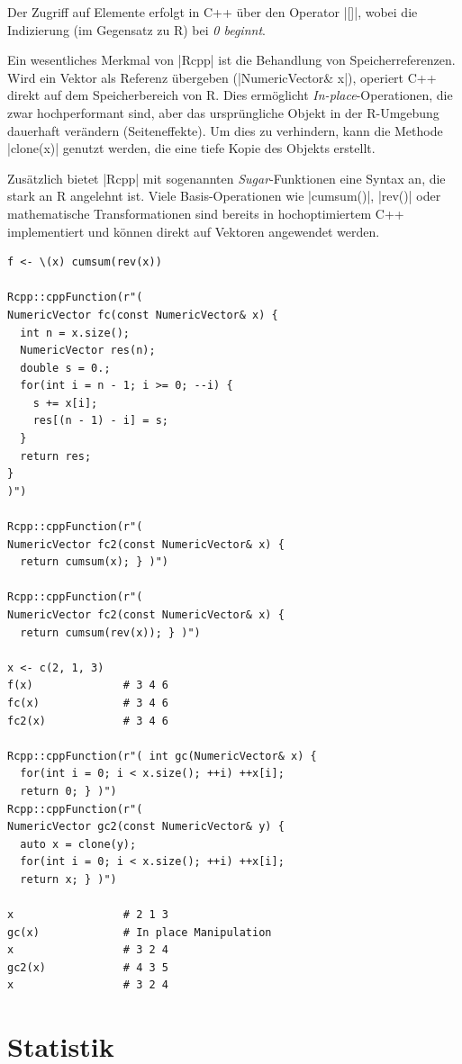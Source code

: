 \documentclass[10pt,twocolumn]{scrartcl}
\renewcommand{\lstinline}{\mycoloredinline}
\begin{document}
Der Zugriff auf Elemente erfolgt in C++ über den Operator \lstinline|[]|, wobei die Indizierung (im Gegensatz zu R) bei \emph{0 beginnt}.

Ein wesentliches Merkmal von \lstinline|Rcpp| ist die Behandlung von Speicherreferenzen. Wird ein Vektor als Referenz übergeben (\lstinline|NumericVector& x|), operiert C++ direkt auf dem Speicherbereich von R. Dies ermöglicht \textit{In-place}-Operationen, die zwar hochperformant sind, aber das ursprüngliche Objekt in der R-Umgebung dauerhaft verändern (Seiteneffekte). Um dies zu verhindern, kann die Methode \lstinline|clone(x)| genutzt werden, die eine tiefe Kopie des Objekts erstellt.

Zusätzlich bietet \lstinline|Rcpp| mit sogenannten \textit{Sugar}-Funktionen eine Syntax an, die stark an R angelehnt ist. Viele Basis-Operationen wie \lstinline|cumsum()|, \lstinline|rev()| oder mathematische Transformationen sind bereits in hochoptimiertem C++ implementiert und können direkt auf Vektoren angewendet werden.

\begin{lstlisting}
f <- \(x) cumsum(rev(x))

Rcpp::cppFunction(r"(
NumericVector fc(const NumericVector& x) {
  int n = x.size();
  NumericVector res(n);
  double s = 0.;
  for(int i = n - 1; i >= 0; --i) {
    s += x[i];
    res[(n - 1) - i] = s;
  }
  return res;
}
)")

Rcpp::cppFunction(r"(
NumericVector fc2(const NumericVector& x) {
  return cumsum(x); } )")

Rcpp::cppFunction(r"(
NumericVector fc2(const NumericVector& x) {
  return cumsum(rev(x)); } )")

x <- c(2, 1, 3)
f(x)              # 3 4 6
fc(x)             # 3 4 6
fc2(x)            # 3 4 6

Rcpp::cppFunction(r"( int gc(NumericVector& x) {
  for(int i = 0; i < x.size(); ++i) ++x[i];
  return 0; } )")
Rcpp::cppFunction(r"(
NumericVector gc2(const NumericVector& y) {
  auto x = clone(y);
  for(int i = 0; i < x.size(); ++i) ++x[i];
  return x; } )")

x                 # 2 1 3
gc(x)             # In place Manipulation
x                 # 3 2 4
gc2(x)            # 4 3 5
x                 # 3 2 4
\end{lstlisting}


\section{Statistik}
\end{document}
